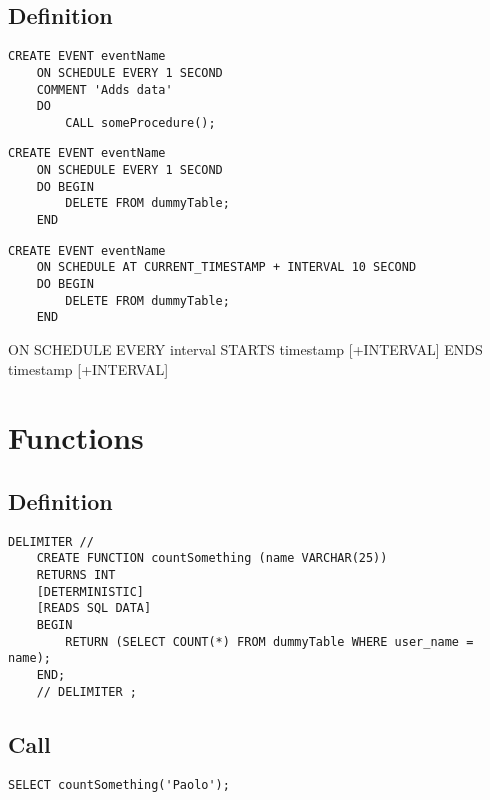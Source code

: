 \documentclass[a4paper]{article}
\begin{document}
\subsection{Definition}

\begin{lstlisting}[style=sql]
    CREATE EVENT eventName
    ON SCHEDULE EVERY 1 SECOND
    COMMENT 'Adds data'
    DO
        CALL someProcedure();
\end{lstlisting}

\begin{lstlisting}[style=sql]
    CREATE EVENT eventName
    ON SCHEDULE EVERY 1 SECOND
    DO BEGIN
        DELETE FROM dummyTable;
    END
\end{lstlisting}

\begin{lstlisting}[style=sql]
    CREATE EVENT eventName
    ON SCHEDULE AT CURRENT_TIMESTAMP + INTERVAL 10 SECOND
    DO BEGIN
        DELETE FROM dummyTable;
    END
\end{lstlisting}

ON SCHEDULE EVERY interval STARTS timestamp [+INTERVAL] ENDS timestamp [+INTERVAL]

\pagebreak

\section{Functions}

\subsection{Definition}

\begin{lstlisting}[style=sql]
    DELIMITER //
    CREATE FUNCTION countSomething (name VARCHAR(25))
    RETURNS INT
    [DETERMINISTIC]
    [READS SQL DATA]
    BEGIN
        RETURN (SELECT COUNT(*) FROM dummyTable WHERE user_name = name);
    END;
    // DELIMITER ;
\end{lstlisting}

\subsection{Call}

\begin{lstlisting}[style=sql]
    SELECT countSomething('Paolo');
\end{lstlisting}

\pagebreak
\end{document}
